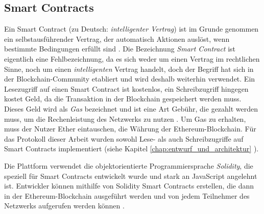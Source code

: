 \subsection{Smart Contracts}
\label{subsection:smart_contracts}


Ein Smart Contract (zu Deutsch: \textit{intelligenter Vertrag}) ist im Grunde genommen ein selbstausführender Vertrag, der automatisch Aktionen auslöst, wenn bestimmte Bedingungen erfüllt sind \Parencite[S. 1-2]{Perez_SmartContractVulnerabilities}. Die Bezeichnung \textit{Smart Contract} ist eigentlich eine Fehlbezeichnung, da es sich weder um einen Vertrag im rechtlichen Sinne, noch um einen \textit{intelligenten} Vertrag handelt, doch der Begriff hat sich in der Blockchain-Community etabliert und wird deshalb weiterhin verwendet. Ein Lesezugriff auf einen Smart Contract ist kostenlos, ein Schreibzugriff hingegen kostet Geld, da die Transaktion in der Blockchain gespeichert werden muss. Dieses Geld wird als \textit{Gas} bezeichnet und ist eine Art Gebühr, die gezahlt werden muss, um die Rechenleistung des Netzwerks zu nutzen \Parencite[S. 127]{Antonopoulos_MasteringEthereum}. Um Gas zu erhalten, muss der Nutzer Ether eintauschen, die Währung der Ethereum-Blockchain.
Für das Protokoll dieser Arbeit wurden sowohl Lese- als auch Schreibzugriffe auf Smart Contracts implementiert (siehe Kapitel \ref{chap:entwurf_und_architektur} \textit{}).

Die Plattform verwendet die objektorientierte Programmiersprache \textit{Solidity}, die speziell für Smart Contracts entwickelt wurde und stark an JavaScript angelehnt ist. Entwickler können mithilfe von Solidity Smart Contracts erstellen, die dann in der Ethereum-Blockchain ausgeführt werden und von jedem Teilnehmer des Netzwerks aufgerufen werden können \Parencite[S. 127-133]{Antonopoulos_MasteringEthereum}.
